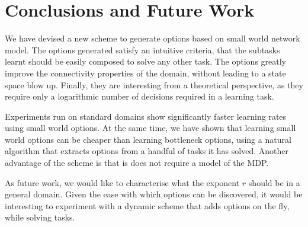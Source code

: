 \section{Conclusions and Future Work}
\label{sec:conclusions}

We have devised a new scheme to generate options based on small world
network model. The options generated satisfy an intuitive criteria, that
the subtasks learnt should be easily composed to solve any other task.
The options greatly improve the connectivity properties of the domain,
without leading to a state space blow up. Finally, they are interesting
from a theoretical perspective, as they require only a logarithmic
number of decisions required in a learning task.

Experiments run on standard domains show significantly faster learning
rates using small world options. At the same time, we have shown that
learning small world options can be cheaper than learning bottleneck
options, using a natural algorithm that extracts options from a handful
of tasks it has solved. Another advantage of the scheme is that is does
not require a model of the MDP. 

As future work, we would like to characterise what the exponent $r$
should be in a general domain. Given the ease with which options can be
discovered, it would be interesting to experiment with a dynamic scheme
that adds options on the fly, while solving tasks.


